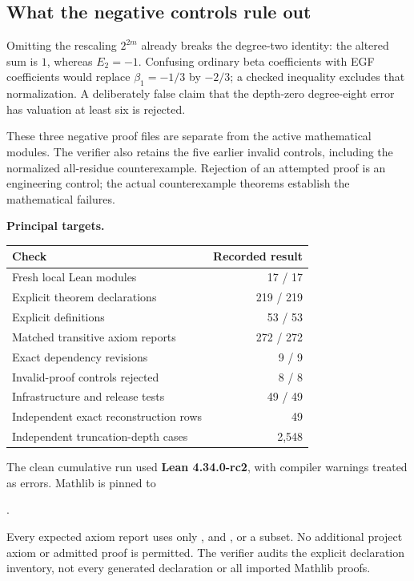 \subsection*{What the negative controls rule out}
Omitting the rescaling $2^{2m}$ already breaks the degree-two identity: the altered sum is $1$, whereas $E_2=-1$. Confusing ordinary beta coefficients with EGF coefficients would replace $\beta_1=-1/3$ by $-2/3$; a checked inequality excludes that normalization. A deliberately false claim that the depth-zero degree-eight error has valuation at least six is rejected.

These three negative proof files are separate from the active mathematical modules. The verifier also retains the five earlier invalid controls, including the normalized all-residue counterexample. Rejection of an attempted proof is an engineering control; the actual counterexample theorems establish the mathematical failures.

\textbf{Principal targets.}\par
{}\par
{}\par
{}
\par\medskip
{}
\begin{center}
\begin{tabular}{@{}p{}r@{}}
\toprule
Check & Recorded result\\\midrule
Fresh local Lean modules & 17 / 17\\
Explicit theorem declarations & 219 / 219\\
Explicit definitions & 53 / 53\\
Matched transitive axiom reports & 272 / 272\\
Exact dependency revisions & 9 / 9\\
Invalid-proof controls rejected & 8 / 8\\
Infrastructure and release tests & 49 / 49\\
Independent exact reconstruction rows & 49\\
Independent truncation-depth cases & 2,548\\\bottomrule
\end{tabular}
\end{center}
The clean cumulative run used \textbf{Lean 4.34.0-rc2}, with compiler warnings treated as errors. Mathlib is pinned to
\begin{center}
.
\end{center}
Every expected axiom report uses only ,  and , or a subset. No additional project axiom or admitted proof is permitted. The verifier audits the explicit declaration inventory, not every generated declaration or all imported Mathlib proofs.

